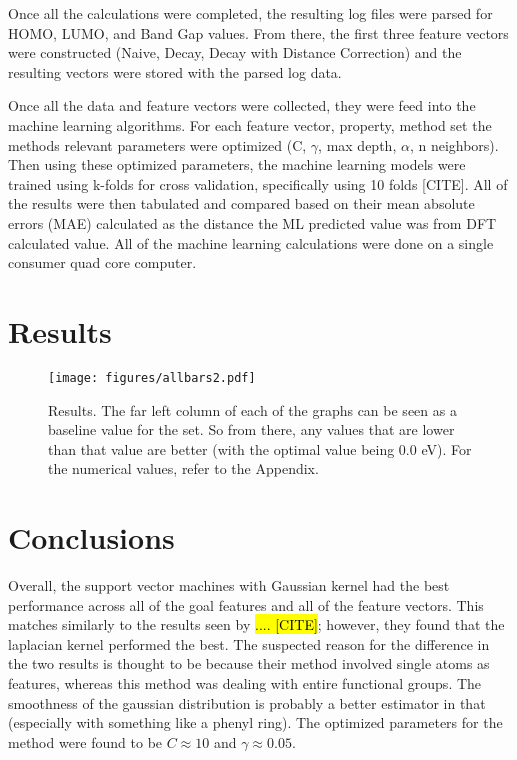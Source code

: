 \documentclass[10pt]{article}
\begin{document}
Once all the calculations were completed, the resulting log files were parsed for HOMO, LUMO, and Band Gap values. From there, the first three feature vectors were constructed (Naive, Decay, Decay with Distance Correction) and the resulting vectors were stored with the parsed log data.

Once all the data and feature vectors were collected, they were feed into the machine learning algorithms. For each feature vector, property, method set the methods relevant parameters were optimized (C, $\gamma$, max depth, $\alpha$, n neighbors). Then using these optimized parameters, the machine learning models were trained using k-folds for cross validation, specifically using 10 folds [CITE]. All of the results were then tabulated and compared based on their mean absolute errors (MAE) calculated as the distance the ML predicted value was from DFT calculated value. All of the machine learning calculations were done on a single consumer quad core computer.

\section{Results}

 \begin{figure}[H]
   \begin{center}
     \texttt{[image: figures/allbars2.pdf]}
   \end{center}
   \caption{Results. The far left column of each of the graphs can be seen as a baseline value for the set. So from there, any values that are lower than that value are better (with the optimal value being 0.0 eV). For the numerical values, refer to the Appendix.}
   \label{fig:results}
 \end{figure}

\section{Conclusions}

Overall, the support vector machines with Gaussian kernel had the best performance across all of the goal features and all of the feature vectors. This matches similarly to the results seen by \hl{.... [CITE]}; however, they found that the laplacian kernel performed the best. The suspected reason for the difference in the two results is thought to be because their method involved single atoms as features, whereas this method was dealing with entire functional groups. The smoothness of the gaussian distribution is probably a better estimator in that (especially with something like a phenyl ring). The optimized parameters for the method were found to be $C \approx 10$ and $\gamma \approx 0.05$.
\end{document}
